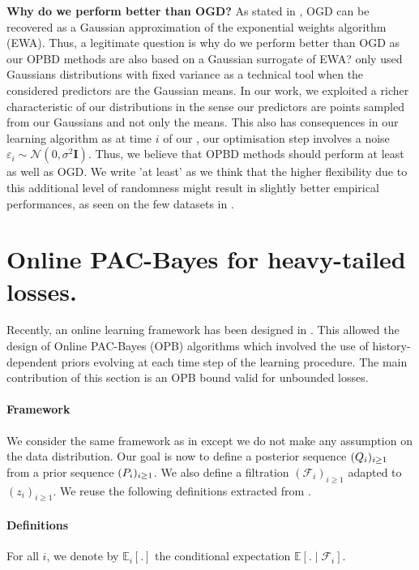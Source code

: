 \textbf{Why do we perform better than OGD?} As stated in , OGD can be recovered as a Gaussian approximation of the exponential weights algorithm (EWA). Thus, a legitimate question is why do we perform better than OGD as our OPBD methods are also based on a Gaussian surrogate of EWA?  \cite{hoeven2018many} only used Gaussians distributions with fixed variance as a technical tool when the considered predictors are the Gaussian means. In our work, we exploited a richer characteristic of our distributions in the sense our predictors are points sampled from our Gaussians and not only the means. This also has consequences in our learning algorithm as at time $i$ of our , our optimisation step involves a noise $\varepsilon_i\sim \mathcal{N}(0,\sigma^2\mathbf{I})$. Thus, we believe that OPBD methods should perform at least as well as OGD.
We write 'at least' as we think that the higher flexibility due to this additional level of randomness might result in slightly better empirical performances, as seen on the few datasets in .





\section{Online PAC-Bayes for heavy-tailed losses.}
\label{sec: heavy-tailed}

Recently, an online learning framework has been designed in \citet{haddouche2022online}. This allowed the design of Online PAC-Bayes (OPB) algorithms which involved the use of history-dependent priors evolving at each time step of the learning procedure. The main contribution of this section is an OPB bound valid for unbounded losses.

\paragraph{Framework} We consider the same framework as in  except we do not make any assumption on the data distribution. Our goal is now to define a posterior sequence $(\\Q_{i})_{i\geq 1}$ from a prior sequence $(\\P_{i})_{i\geq 1}$. We also define a filtration $(\mathcal{F}_{i})_{i\geq 1}$ adapted to $(z_i)_{i\geq 1}$. We reuse the following definitions extracted from \cite{haddouche2022online}.

\paragraph{Definitions} For all $i$, we denote by $\mathbb{E}_{i}[.]$ the conditional expectation $\mathbb{E}[.\mid \mathcal{F}_i]$.

